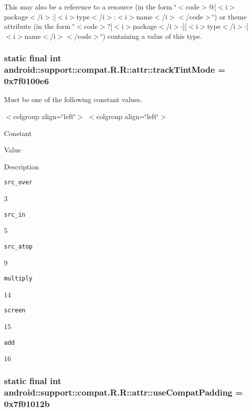 This may also be a reference to a resource (in the form \char`\"{}$<$code$>$@\mbox{[}$<$i$>$package$<$/i$>$:\mbox{]}$<$i$>$type$<$/i$>$:$<$i$>$name$<$/i$>$$<$/code$>$\char`\"{}) or theme attribute (in the form \char`\"{}$<$code$>$?\mbox{[}$<$i$>$package$<$/i$>$:\mbox{]}\mbox{[}$<$i$>$type$<$/i$>$:\mbox{]}$<$i$>$name$<$/i$>$$<$/code$>$\char`\"{}) containing a value of this type. \hypertarget{classandroid_1_1support_1_1compat_1_1_r_1_1attr_d0228daac783b9c00a341fd9cafa1b9e}{
\subsubsection[{trackTintMode}]{\setlength{\rightskip}{0pt plus 5cm}static final int android::support::compat.R.R::attr::trackTintMode = 0x7f0100e6}}
\label{classandroid_1_1support_1_1compat_1_1_r_1_1attr_d0228daac783b9c00a341fd9cafa1b9e}


Must be one of the following constant values. \begin{TabularC}{0}
\hline
\end{TabularC}
$<$colgroup align=\char`\"{}left\char`\"{}$>$ $<$colgroup align=\char`\"{}left\char`\"{}$>$ 

Constant

Value

Description 

{\tt src\_\-over}

3

{\tt src\_\-in}

5

{\tt src\_\-atop}

9

{\tt multiply}

14

{\tt screen}

15

{\tt add}

16\hypertarget{classandroid_1_1support_1_1compat_1_1_r_1_1attr_3aca1eee0b99858efb7e3335596dff76}{
\subsubsection[{useCompatPadding}]{\setlength{\rightskip}{0pt plus 5cm}static final int android::support::compat.R.R::attr::useCompatPadding = 0x7f01012b}}
\label{classandroid_1_1support_1_1compat_1_1_r_1_1attr_3aca1eee0b99858efb7e3335596dff76}


